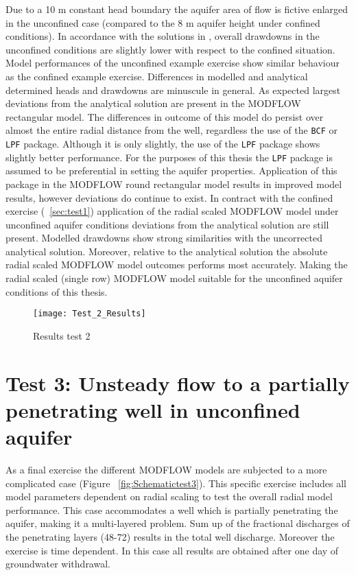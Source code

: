 Due to a 10 m constant head boundary the aquifer area of flow is fictive enlarged in the unconfined case (compared to the 8 m aquifer height under confined conditions). In accordance with the solutions in \citet{Langevin2008}, overall drawdowns in the unconfined conditions are slightly lower with respect to the confined situation. 
\bigskip
Model performances of the unconfined example exercise show similar behaviour as the confined example exercise. Differences in modelled and analytical determined heads and drawdowns are minuscule in general. As expected largest deviations from the analytical solution are present in the MODFLOW rectangular model. The differences in outcome of this model do persist over almost the entire radial distance from the well, regardless the use of the \texttt{BCF} or \texttt{LPF} package. Although it is only slightly, the use of the \texttt{LPF} package shows slightly better performance. For the purposes of this thesis the \texttt{LPF} package is assumed to be preferential in setting the aquifer properties. Application of this package in the MODFLOW round rectangular model results in improved model results, however deviations do continue to exist. In contract with the confined exercise (~\ref{sec:test1}) application of the radial scaled MODFLOW model under unconfined aquifer conditions  deviations from the analytical solution are still present. Modelled drawdowns show strong similarities with the uncorrected analytical solution. Moreover, relative to the analytical solution the absolute radial scaled MODFLOW model outcomes performs most accurately. Making the radial scaled (single row) MODFLOW model suitable for the unconfined aquifer conditions of this thesis.   

\begin{figure}[H]
 \centering\texttt{[image: Test\_2\_Results]}
 \captionsetup{justification=centering}
 \caption{Results test 2}
 \label{fig:Test2_results}
\end{figure} 

\clearpage\section{Test 3: Unsteady flow to a partially penetrating well in unconfined aquifer}

As a final exercise the different MODFLOW models are subjected to a more complicated case (Figure ~\ref{fig:Schematictest3}). This specific exercise includes all model parameters dependent on radial scaling to test the overall radial model performance. This case accommodates a well which is partially penetrating the aquifer, making it a multi-layered problem. Sum up of the fractional discharges of the penetrating layers (48-72) results in the total well discharge. Moreover the exercise is time dependent. In this case all results are obtained after one day of groundwater withdrawal. 


